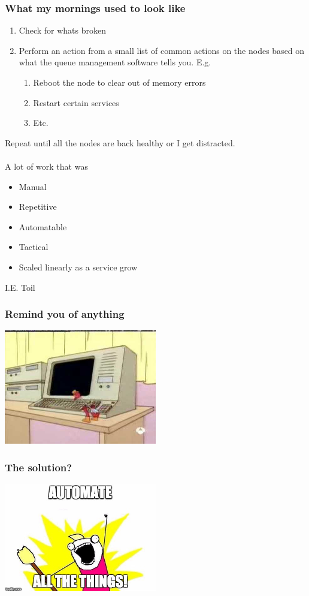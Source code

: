 \documentclass{beamer}
\begin{document}
\begin{frame}
\frametitle{What my mornings used to look like}
\begin{enumerate}
	\item Check for whats broken
	\item Perform an action from a small list of common actions on the nodes based on what the queue management software tells you. E.g.
	\begin{enumerate}
		\item Reboot the node to clear out of memory errors
		\item Restart certain services
		\item Etc.
	\end{enumerate}
\end{enumerate}
Repeat until all the nodes are back healthy or I get distracted.\\~\\
A lot of work that was
\begin{itemize}
	\item Manual
	\item Repetitive
	\item Automatable
	\item Tactical
	\item Scaled linearly as a service grow
\end{itemize}
I.E. Toil
\end{frame}

\begin{frame}
\frametitle{Remind you of anything}
    \begin{center}
     \includegraphics[width=0.5\textwidth]{imgs/bird.jpg}
     \end{center}
\end{frame}

\begin{frame}
\frametitle{The solution?}
    \begin{center}
     \includegraphics[width=0.5\textwidth]{imgs/automate.jpeg}
     \end{center}
\end{frame}
\end{document}
